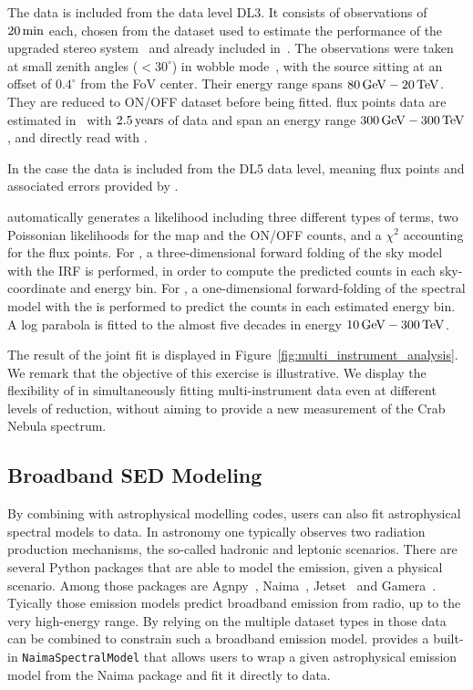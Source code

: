 \documentclass[traditabstract, longauth]{aa}
\newcommand{\code}[1]{\texttt{#1}}
\begin{document}
The \magic data is included from the data level DL3. It consists of %
observations of $20\,{\rm min}$ each, chosen from the dataset used to estimate
the performance of the upgraded stereo system~\citep{magic_performance} and
already included in~\cite{joint_crab}. The observations were taken at small
zenith angles ($<30^{\circ}$) in wobble mode~\citep{fomin_1994}, with the
source sitting at an offset of $0.4^{\circ}$ from the FoV center. Their energy
range spans $80\,{\rm GeV} - 20\,{\rm TeV}$. They are reduced to ON/OFF
dataset before being fitted. \hawc flux points data are estimated
in~\cite{hawc_crab_2019} with $2.5\,{\rm years}$ of data and span an energy
range $300\,{\rm GeV} - 300\,{\rm TeV}$, and directly read with \gammapy.

In the case the \hawc data is included from the DL5 data level, meaning
flux points and associated errors provided by \cite{hawc_crab_2019}.

\gammapy automatically generates a likelihood including three different types
of terms, two Poissonian likelihoods for the \fermi map and the
ON/OFF counts, and a $\chi^2$ accounting for the \hawc flux points. For \fermi, a 
three-dimensional forward folding of the sky model with the IRF is performed,
in order to compute the predicted counts in each sky-coordinate and energy bin.
For \magic, a one-dimensional forward-folding of the spectral model with the
\irfs is performed to predict the counts in each estimated energy bin. A log
parabola is fitted to the almost five decades in energy $10\,{\rm GeV} -
	300\,{\rm TeV}$. %

The result of the joint fit is displayed in
Figure~\ref{fig:multi_instrument_analysis}. We remark that the objective of this
exercise is illustrative. We display the flexibility of \gammapy in
simultaneously fitting multi-instrument data even at different levels of
reduction, without aiming to provide a new measurement of the Crab Nebula
spectrum.


\subsection{Broadband SED Modeling}
\label{ssec:broadband-sed-modeling}
By combining \gammapy with astrophysical modelling codes, users can also fit
astrophysical spectral models to \gammaray data. In \gammaray
astronomy one typically observes two radiation production
mechanisms, the so-called hadronic and leptonic scenarios.
There are several Python packages that are able to model
the \gammaray emission, given a physical scenario. Among those
packages are Agnpy~\citep{agnpy}, Naima~\citep{naima}, Jetset~\citep{jetset}
and Gamera~\citep{gamera}.
Tyically those emission models predict broadband emission from
radio, up to the very high-energy \gammaray range.
By relying on the multiple dataset types in \gammapy those
data can be combined to constrain such a broadband emission model.
\gammapy provides a built-in \code{NaimaSpectralModel} that allows
users to wrap a given astrophysical emission model from the
Naima package and fit it directly to \gammaray data.
\end{document}
